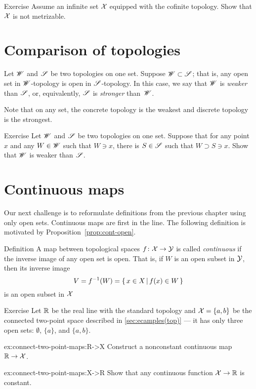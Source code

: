 \begin{thm}{Exercise}\label{ex:cofinite-metrizable}
Assume an infinite set $\mathcal{X}$ equipped with the cofinite topology.
Show that $\mathcal{X}$ is not metrizable.
\end{thm}

\section{Comparison of topologies}

Let $\mathscr{W}$ and $\mathscr{S}$ be two topologies on one set.
Suppose $\mathscr{W}\subset\mathscr{S}$; that is, any open set in $\mathscr{W}$-topology is open in $\mathscr{S}$-topology.
In this case, we say that $\mathscr{W}$ is \emph{weaker} than $\mathscr{S}$, or, equivalently, $\mathscr{S}$ is \emph{stronger} than~$\mathscr{W}$.

Note that on any set, the concrete topology is the weakest and discrete topology is the strongest.

\begin{thm}{Exercise}\label{ex:weaker-top}
Let $\mathscr{W}$ and $\mathscr{S}$ be two topologies on one set.
Suppose that for any point $x$ and any $W\in\mathscr{W}$ such that $W\ni x$, there is $S\in \mathscr{S}$ such that 
$W\supset S\ni x$.
Show that $\mathscr{W}$ is weaker than $\mathscr{S}$.
\end{thm}



\section{Continuous maps}

Our next challenge is to reformulate definitions from the previous chapter using only open sets.
Continuous maps are first in the line.
The following definition is motivated by Proposition~\ref{prop:cont-open}.

\begin{thm}{Definition}\label{def:cont-top}
A map between topological spaces 
$f\colon\mathcal{X}\to\mathcal{Y}$ is called \emph{continuous} if the inverse image of any open set is open.
That is, if $W$ is an open subset in $\mathcal{Y}$, then its inverse image
\[V=f^{-1}(W)=\left\{\,{x\in X}\,\middle|\,{f(x)\in W}\,\right\}\]
is an open subset in $\mathcal{X}$
\end{thm}

\begin{thm}{Exercise}\label{ex:connect-two-point-maps}
Let $\mathbb{R}$ be the real line with the standard topology
and $\mathcal{X}=\{a,b\}$ be the connected two-point space described in \ref{sec:ecamples(top)} --- it has only three open sets: $\emptyset$, $\{a\}$, and $\{a,b\}$.

\begin{subthm}{ex:connect-two-point-maps:R->X}
Construct a nonconstant continuous map $\mathbb{R}\to \mathcal{X}$.
\end{subthm}

\begin{subthm}{ex:connect-two-point-maps:X->R}
Show that any continuous function $\mathcal{X}\to \mathbb{R}$ is constant.
\end{subthm}

\end{thm}

